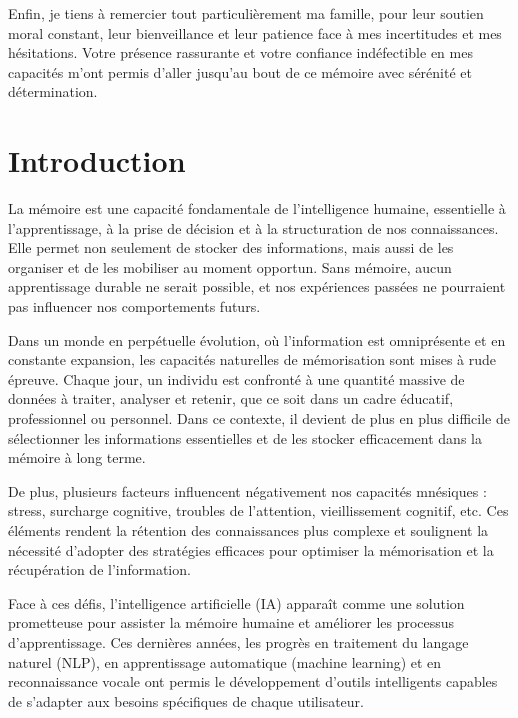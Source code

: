 \documentclass[11pt,a4paper]{report}
\begin{document}
Enfin, je tiens à remercier tout particulièrement ma famille, pour leur soutien moral constant, leur bienveillance et leur patience face à mes incertitudes et mes hésitations. Votre présence rassurante et votre confiance indéfectible en mes capacités m’ont permis d’aller jusqu’au bout de ce mémoire avec sérénité et détermination.

\chapter*{Introduction}

La mémoire est une capacité fondamentale de l’intelligence humaine, essentielle à l’apprentissage, à la prise de décision et à la structuration de nos connaissances. Elle permet non seulement de stocker des informations, mais aussi de les organiser et de les mobiliser au moment opportun. Sans mémoire, aucun apprentissage durable ne serait possible, et nos expériences passées ne pourraient pas influencer nos comportements futurs.

Dans un monde en perpétuelle évolution, où l’information est omniprésente et en constante expansion, les capacités naturelles de mémorisation sont mises à rude épreuve. Chaque jour, un individu est confronté à une quantité massive de données à traiter, analyser et retenir, que ce soit dans un cadre éducatif, professionnel ou personnel. Dans ce contexte, il devient de plus en plus difficile de sélectionner les informations essentielles et de les stocker efficacement dans la mémoire à long terme.

De plus, plusieurs facteurs influencent négativement nos capacités mnésiques : stress, surcharge cognitive, troubles de l’attention, vieillissement cognitif, etc. Ces éléments rendent la rétention des connaissances plus complexe et soulignent la nécessité d’adopter des stratégies efficaces pour optimiser la mémorisation et la récupération de l’information.

Face à ces défis, l’intelligence artificielle (IA) apparaît comme une solution prometteuse pour assister la mémoire humaine et améliorer les processus d’apprentissage. Ces dernières années, les progrès en traitement du langage naturel (NLP), en apprentissage automatique (machine learning) et en reconnaissance vocale ont permis le développement d’outils intelligents capables de s’adapter aux besoins spécifiques de chaque utilisateur.
\end{document}
